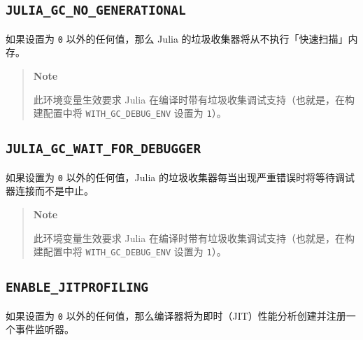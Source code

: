 \hypertarget{15291982466110123243}{}


\subsection{\texttt{JULIA\_GC\_NO\_GENERATIONAL}}



如果设置为 \texttt{0} 以外的任何值，那么 Julia 的垃圾收集器将从不执行「快速扫描」内存。



\begin{quote}
\textbf{Note}

此环境变量生效要求 Julia 在编译时带有垃圾收集调试支持（也就是，在构建配置中将 \texttt{WITH\_GC\_DEBUG\_ENV} 设置为 \texttt{1}）。

\end{quote}


\hypertarget{4439082668862420182}{}


\subsection{\texttt{JULIA\_GC\_WAIT\_FOR\_DEBUGGER}}



如果设置为 \texttt{0} 以外的任何值，Julia 的垃圾收集器每当出现严重错误时将等待调试器连接而不是中止。



\begin{quote}
\textbf{Note}

此环境变量生效要求 Julia 在编译时带有垃圾收集调试支持（也就是，在构建配置中将 \texttt{WITH\_GC\_DEBUG\_ENV} 设置为 \texttt{1}）。

\end{quote}


\hypertarget{1100661411174026998}{}


\subsection{\texttt{ENABLE\_JITPROFILING}}



如果设置为 \texttt{0} 以外的任何值，那么编译器将为即时（JIT）性能分析创建并注册一个事件监听器。



